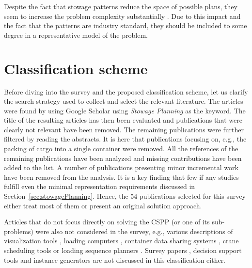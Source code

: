 \documentclass[preprint,12pt,authoryear]{elsarticle}
\begin{document}
Despite the fact that stowage patterns reduce the space of possible plans, they seem to increase the problem complexity substantially \cite{Christensen2017AStowage}. Due to this impact and the fact that the patterns are industry standard, they should be included to some degree in a representative model of the problem.  


\section{Classification scheme}
\label{sec:literatureSurvey}
Before diving into the survey and the proposed classification scheme, let us clarify the search strategy used to collect and select the relevant literature. The articles were found by using Google Scholar using \textit{Stowage Planning} as the keyword. The title of the resulting articles has then been evaluated and publications that were clearly not relevant have been removed. The remaining publications were further filtered by reading the abstracts. It is here that publications focusing on, e.g., the packing of cargo into a single container were removed. All the references of the remaining publications have been analyzed and missing contributions have been added to the list. A number of publications presenting minor incremental work have been removed from the analysis. It is a key finding that few if any studies fulfill even the minimal representation requirements discussed in  Section~\ref{sec:stowagePlanning}. Hence, the 54 publications selected for this survey either treat most of them or present an original solution approach.

Articles that do not focus directly on solving the CSPP (or one of its sub-problems) were also not considered in the survey, e.g., various descriptions of visualization tools \citep{Aye2010VisualizationSystem, Song2010ResearchLogistics}, loading computers \citep{Nugroho2021RegulatoryConsiderations, Wu2021ResearchShips}, container data sharing systems \citep{Conca2018AutomationPlanning}, crane scheduling tools \citep{Hsu2021JointApproach} or loading sequence planners \citep{Serban2017AStrategy}. Survey papers \citep{Zhang2008}, decision support tools \citep{Martin1988ComputerizedEvaluation, Saginaw1989DecisionPlanning} and instance generators \citep{Cruz-reyes2013ConstructivePlanning} are not discussed in this classification either.
\end{document}
